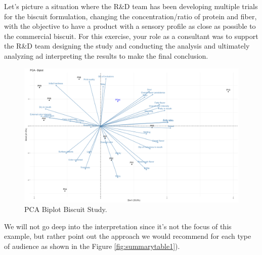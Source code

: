 \documentclass[
]{krantz}
\begin{document}
Let's picture a situation where the R\&D team has been developing multiple trials for the biscuit formulation, changing the concentration/ratio of protein and fiber, with the objective to have a product with a sensory profile as close as possible to the commercial biscuit. For this exercise, your role as a consultant was to support the R\&D team designing the study and conducting the analysis and ultimately analyzing ad interpreting the results to make the final conclusion.

\begin{figure}

{\centering \includegraphics[width=1\linewidth]{images/PCA} 

}

\caption{PCA Biplot Biscuit Study.}\label{fig:pca}
\end{figure}

We will not go deep into the interpretation since it's not the focus of this example, but rather point out the approach we would recommend for each type of audience as shown in the Figure \ref{fig:summarytable1}).
\end{document}
